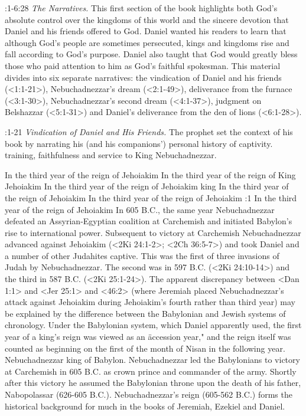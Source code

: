 
:1-6:28 {} {\it The Narratives.\/} This first section of the book highlights both God's absolute control
over the kingdoms of this world  
and the sincere devotion that Daniel and his friends offered to 
God. Daniel wanted his readers to learn that although God's people are sometimes persecuted, kings
and kingdoms rise and fall according to God's purpose. Daniel also taught that God would greatly
bless those who paid attention to him as God's faithful  
spokesman. This material divides into six separate narratives: the 
vindication of Daniel and his friends (<1:1-21>), Nebuchadnezzar's 
dream (<2:1-49>), deliverance from the furnace (<3:1-30>), Nebuchadnezzar's second dream (<4:1-37>),
judgment on Belshazzar (<5:1-31>)  and Daniel's deliverance from the den of lions (<6:1-28>).

:1-21 {} {\it Vindication of Daniel and His Friends.\/} The prophet set 
the context of his book by narrating his (and his companions') personal history of
captivity. training, faithfulness and service to King  
Nebuchadnezzar.

    {In the third year of the reign of Jehoiakim} %
    {In the third year of the reign of King Jehoiakim} %
    {In the third year of the reign of Jehoiakim king} %
    {In the third year of the reign of Jehoiakim} %
    {In the third year of the reign of Jehoiakim} %
:1 {In the third year of the reign of Jehoiakim} In 605 B.C., the 
same year Nebuchadnezzar defeated an Assyrian-Egyptian coalition at Carchemish and initiated
Babylon's rise to international  
power. Subsequent to victory at Carchemish Nebuchadnezzar advanced against Jehoiakim (<2Ki 24:1-2>;
<2Ch 36:5-7>) and took Daniel and a number of other Judahites captive.
This was the first of three invasions of Judah by Nebuchadnezzar.
The second was in 597 B.C. (<2Ki 24:10-14>) and the third in 587 B.C. (<2Ki 25:1-24>). The 
apparent discrepancy between <Dan 1:1> and <Jer 25:1> and 
<46:2> (where Jeremiah placed Nebuchadnezzar's attack against Jehoiakim during Jehoiakim's fourth
rather than third year) may be  explained by the difference between the Babylonian and Jewish 
systems of chronology. Under the Babylonian system, which Daniel apparently used, the first year of
a king's reign was viewed as an  \"accession year," and the reign itself was counted as beginning on 
the first of the month of Nisan in the following year. Nebuchadnezzar king of
Babylon. Nebuchadnezzar led the Babylonians to  
victory at Carchemish in 605 B.C. as crown prince and commander 
of the army. Shortly after this victory he assumed the Babylonian 
throne upon the death of his father, Nabopolassar (626-605 B.C.). 
Nebuchadnezzar's reign (605-562 B.C.) forms the historical background for much in the books of
Jeremiah, Ezekiel and Daniel.


